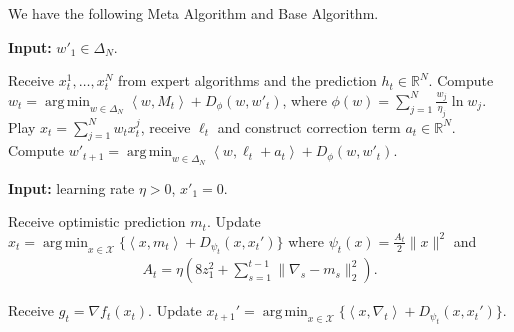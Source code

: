\documentclass{article}
\theoremstyle{plain}
\theoremstyle{definition}
\theoremstyle{remark}
\DeclareMathOperator*{\argmin}{arg\,min}
\newcommand{\cA}{\mathcal{A}}
\newcommand{\cX}{\mathcal{X}}
\newcommand{\real}{\mathbb{R}}
\newcommand{\inner}[2]{\left\langle #1, #2 \right\rangle}
\begin{document}
We have the following Meta Algorithm and Base Algorithm.
\begin{algorithm}[h]
\caption{Meta Algorithm (MsMwC)}\label{alg:metafree}
\textbf{Input:} $w'_1\in\Delta_N$.
\begin{algorithmic}[1]
\STATE Receive $x_t^1,\dotsc,x_t^N$ from expert algorithms and the prediction $h_t\in\real^N$.
\STATE Compute $w_t=\argmin_{w\in\Delta_N}\inner{w}{M_t}+D_{\phi}(w,w'_t)$, where $\phi(w)=\sum_{j=1}^N \frac{w_j}{\eta_{j}}\ln w_j$.
\STATE Play $x_t=\sum_{j=1}^N w_t x_t^j$, receive $\ell_t$ and construct correction term $a_t\in\real^N$.
\STATE Compute $w'_{t+1}=\argmin_{w\in\Delta_N}\inner{w}{\ell_t+a_t}+D_{\phi}(w,w'_t)$.
\ENDFOR
\end{algorithmic}
\end{algorithm}

\begin{algorithm}[h]
\caption{Base Algorithm $\cA$ (ONS)}\label{alg:basefree}
\begin{algorithmic}[1]
    \STATE \textbf{Input:} learning rate $\eta>0$, $x'_1=0$.
    
        \STATE Receive optimistic prediction $m_t$.
        \STATE Update $x_t = \argmin_{x\in\cX}\{\inner{x}{m_t} + D_{\psi_{t}}(x,x_t')\}$  where $\psi_t(x) = \frac{A_t}{2}\|x\|^2$ and
        \begin{align*}
            A_t =\eta(8z_1^2+\sum_{s=1}^{t-1}\|\nabla_s-m_s\|_2^2).
        \end{align*}
        
        \STATE Receive $g_t=\nabla f_t(x_t)$.
        \STATE Update $x_{t+1}' = \argmin_{x\in\cX}\{\inner{x}{\nabla_t} + D_{\psi_t}(x, x_t')\}$.
    \ENDFOR
\end{algorithmic}
\end{algorithm}
\end{document}
